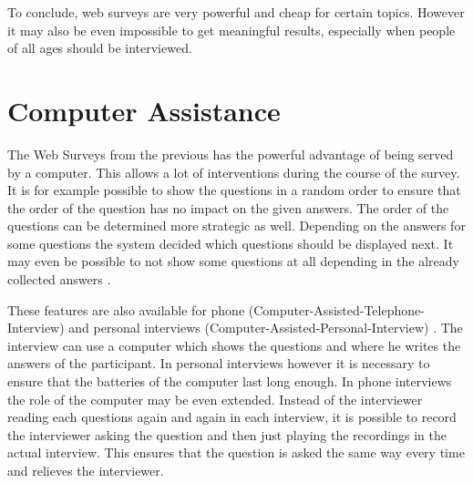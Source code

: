 \documentclass{report}
\begin{document}
To conclude, web surveys are very powerful and cheap for certain topics. However it may also be even impossible to get meaningful results, especially when people of all ages should be interviewed.

\section{Computer Assistance}

The Web Surveys from the previous has the powerful advantage of being served by a computer. This allows a lot of interventions during the course of the survey. It is for example possible to show the questions in a random order to ensure that the order of the question has no impact on the given answers. The order of the questions can be determined more strategic as well. Depending on the answers for some questions the system decided which questions should be displayed next. It may even be possible to not show some questions at all depending in the already collected answers \cite{cpe, cph, cw}.

These features are also available for phone (Computer-Assisted-Telephone-Interview) \cite{cph} and personal interviews (Computer-Assisted-Personal-Interview) \cite{cpe}. The interview can use a computer which shows the questions and where he writes the answers of the participant. In personal interviews however it is necessary to ensure that the batteries of the computer last long enough. In phone interviews the role of the computer may be even extended. Instead of the interviewer reading each questions again and again in each interview, it is possible to record the interviewer asking the question and then just playing the recordings in the actual interview. This ensures that the question is asked the same way every time and relieves the interviewer.
\end{document}
